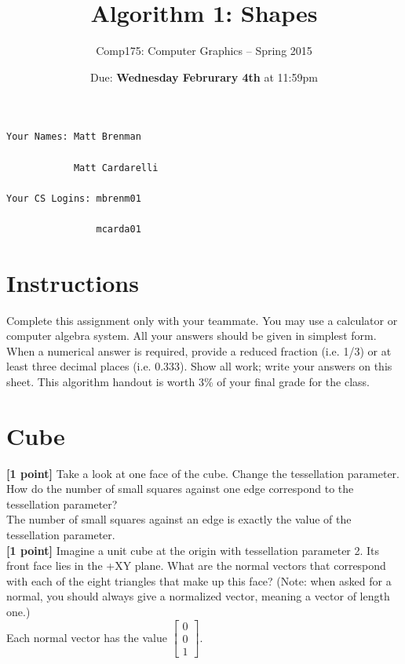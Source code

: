 \documentclass[10pt,twocolumn]{article}
\title{\Huge{\bf Algorithm 1: Shapes}}
\author{Comp175: Computer Graphics -- Spring 2015}
\date{Due:  {\bf Wednesday Februrary 4th} at 11:59pm}                                           %
\begin{document}
\maketitle

\begin{verbatim}
Your Names: Matt Brenman

            Matt Cardarelli

Your CS Logins: mbrenm01

                mcarda01\end{verbatim}

\section{Instructions}
Complete this assignment only with your teammate. You may use a
calculator or computer algebra system. All your answers should be given in simplest form.
When a numerical answer is required, provide a reduced fraction (i.e. 1/3) or at least three
decimal places (i.e. 0.333). Show all work; write your answers on this sheet. This algorithm handout is worth 3\% of your final grade for the class.


\section{Cube}
 {\bf [1 point]} Take a look at one face of the cube. Change the tessellation parameter. How do the number of small squares against one edge correspond to the tessellation parameter?
\vspace{2em}\\
The number of small squares against an edge is exactly the value of the tessellation parameter.
\vspace{2em} \\
{\bf [1 point]} Imagine a unit cube at the origin with tessellation parameter 2. Its front face lies in the +XY plane. What are the normal vectors that correspond with each of the eight triangles that make up this face? (Note: when asked for a normal, you should always give a normalized vector, meaning a vector of length one.)
\vspace{2em}\\
Each normal vector has the value $\begin{bmatrix} 0 \\ 0\\ 1 \end{bmatrix}$.
\vspace{2em}
\end{document}
